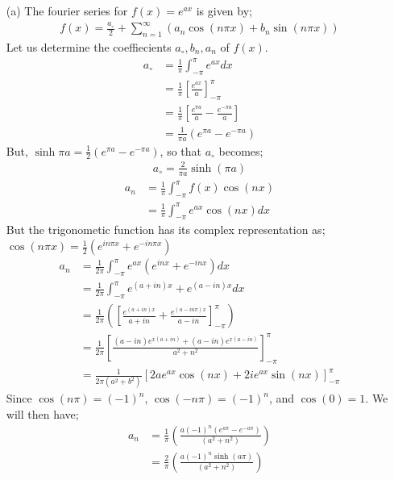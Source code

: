 \documentclass[12pt,a4paper]{article}
\begin{document}
\begin{itemize}
	\item [(a)] The fourier series for $f(x)=e^{ax}$ is given by;
	\begin{align}
	f(x)=\frac{a_{\circ}}{2}+\sum_{n=1}^{\infty} (a_{n}\cos (n\pi x)+b_{n}\sin (n\pi x)) \label{1}
	\end{align}
	Let us determine the coeffiecients ${a_{\circ}, b_{n}, a_{n}}$ of $f(x)$.
	\begin{align*}
	a_{\circ}&=\frac{1}{\pi}\int_{-\pi}^{\pi} e^{ax} dx\\
	&=\frac{1}{\pi}\left[\frac{e^{ax}}{a}\right]^{\pi}_{-\pi }\\
	&=\frac{1}{\pi}\left[ \frac{e^{\pi a}}{a}-\frac{e^{-\pi a}}{a}\right]\\
	&=\frac{1}{\pi a}(e^{\pi a}-e^{-\pi a})
	\end{align*}
	But, $\sinh \pi a=\frac{1}{2}\left(e^{\pi a}-e^{-\pi a}\right)$, so that $a_{\circ}$ becomes;
	\begin{align*}
	a_{\circ}=\frac{2}{\pi a} \sinh (\pi a)
	\end{align*}
	\begin{align}
	a_{n}&=\frac{1}{\pi}\int_{-\pi}^{\pi}f(x)\cos(n x)\\
	&=\frac{1}{\pi}\int_{-\pi}^{\pi}e^{ax}\cos(n x)dx
	\end{align}
	But the trigonometic function has its complex representation as; $\cos(n\pi x)=\frac{1}{2}\left(e^{in\pi x}+e^{-in\pi x}\right)$ 
	\begin{align*}
	a_{n}&=\frac{1}{2\pi}\int_{-\pi}^{\pi}e^{ax}\left(e^{i n x}+e^{-in x}\right)dx\\
	&=\frac{1}{2\pi}\int_{-\pi}^{\pi}e^{(a+in )x}+e^{(a-in)x}dx\\
	&=\frac{1}{2\pi}\left(\left[\frac{e^{(a+in)x}}{a+in}+\frac{e^{(a-in\pi )x}}{a-in}\right]^{\pi}_{-\pi}\right)\\
	&=\frac{1}{2\pi}\left[\frac{(a-in)e^{x(a+in)}+(a-in)e^{x(a-in)}}{a^{2}+n^{2}}\right]^{\pi}_{-\pi}\\
	&=\frac{1}{2\pi(a^{2}+b^{2})}\left[2ae^{ax}\cos(nx)+2ie^{ax}\sin(nx)\right]^{\pi}_{-\pi}
	\end{align*}
	Since $\cos(n\pi)=(-1)^{n}$,  $\cos(-n\pi)=(-1)^{n}$, and $\cos(0)=1$. We will then have;
	\begin{align*}
	a_{n}&=\frac{1}{\pi}\left(\frac{a(-1)^{n}(e^{a\pi}-e^{-a\pi})}{(a^{2}+n^{2})}\right)\\
	&=\frac{2}{\pi}\left(\frac{a(-1)^{n}\sinh (a\pi)}{(a^{2}+n^{2})}\right)
	\end{align*}

\end{itemize}
\end{document}
